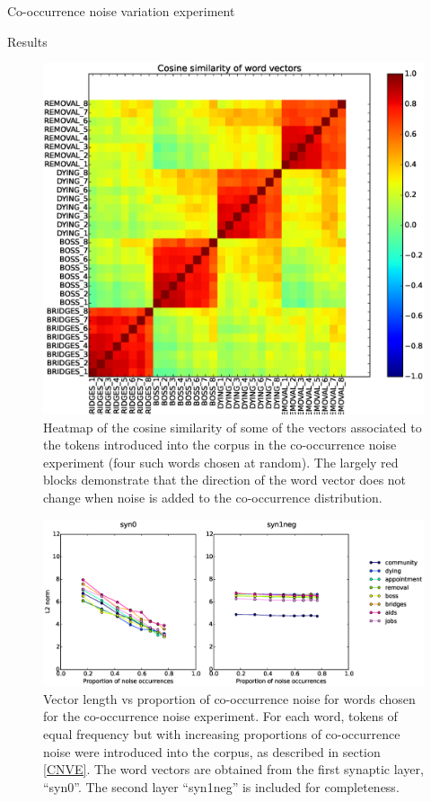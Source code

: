 \documentclass{article} %
\begin{document}
\begin{section}{Co-occurrence noise variation experiment}
\begin{subsection}{Results}
\begin{figure}\label{fig:co-occurrence-noise-heatmap}
	\includegraphics[scale=0.5]{cooccurrence-noise-heatmap}
	\caption{
	Heatmap of the cosine similarity of some of the vectors associated to the
	tokens introduced into the corpus in the co-occurrence noise experiment
	(four such words chosen at random).  The
	largely red blocks demonstrate that the direction of the word vector
	does not change when noise is added to the co-occurrence distribution.
	}
\end{figure}

\begin{figure}\label{fig:co-occurrence-noise-graph}
	\includegraphics[scale=0.6]{cooccurrence-noise-graph}
	\caption{
	Vector length vs proportion of co-occurrence noise for words
	chosen for the co-occurrence noise experiment.  For each word,
	tokens of equal frequency but with increasing proportions of
	co-occurrence noise were introduced into the corpus, as
	described in section \ref{CNVE}.
	The word vectors are obtained from the first synaptic layer, ``syn0''.
	The second layer ``syn1neg'' is included for completeness.
	}
\end{figure}

\end{subsection}

\end{section}
\end{document}
